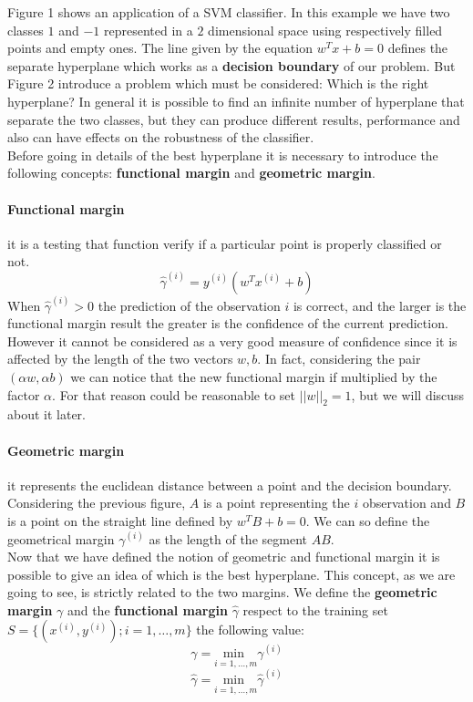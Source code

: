 \documentclass[11pt,a4paper]{article}
\begin{document}
Figure 1 shows an application of a SVM classifier. In this example we have two classes $1$ and $-1$ represented in a $2$ dimensional space using respectively filled points and empty ones. The line given by the equation $w^Tx + b = 0$ defines the separate hyperplane which works as a \textbf{decision boundary} of our problem. But Figure 2 introduce a problem which must be considered: Which is the right hyperplane? In general it is possible to find an infinite number of hyperplane that separate the two classes, but they can produce different results, performance and also can have effects on the robustness of the classifier.\\
Before going in details of the best hyperplane it is necessary to introduce the following concepts: \textbf{functional margin} and \textbf{geometric margin}.

\paragraph{Functional margin} it is a testing that function verify if a particular point is properly classified or not.
$$\hat{\gamma}^{(i)} = y^{(i)}(w^Tx^{(i)} + b)$$
When $\hat{\gamma}^{(i)} > 0$ the prediction of the observation $i$ is correct, and the larger is the functional margin result the greater is the confidence of the current prediction. However it cannot be considered as a very good measure of confidence since it is affected by the length of the two vectors $w, b$. In fact, considering the pair $(\alpha w, \alpha b)$ we can notice that the new functional margin if multiplied by the factor $\alpha$. For that reason could be reasonable to set $||w||_2 = 1$, but we will discuss about it later.

\paragraph{Geometric margin} it represents the euclidean distance between a point and the decision boundary.
Considering the previous figure, $A$ is a point representing the $i$ observation and $B$ is a point on the straight line defined by $w^TB+b = 0$. We can so define the geometrical margin $\gamma^{(i)}$ as the length of the segment $AB$. \\

Now that we have defined the notion of geometric and functional margin it is possible to give an idea of which is the best hyperplane. This concept, as we are going to see, is strictly related to the two margins. We define the \textbf{geometric margin} $\gamma$ and the \textbf{functional margin} $\hat{\gamma}$ respect to the training set $S = \{(x^{(i)},y^{(i)}); i = 1,\dots,m \}$ the following value:
$$\gamma = \underset{i = 1,\dots,m}{\text{min }}\gamma^{(i)}$$
$$\hat{\gamma} = \underset{i = 1,\dots,m}{\text{min }}\hat{\gamma}^{(i)}$$
\end{document}
